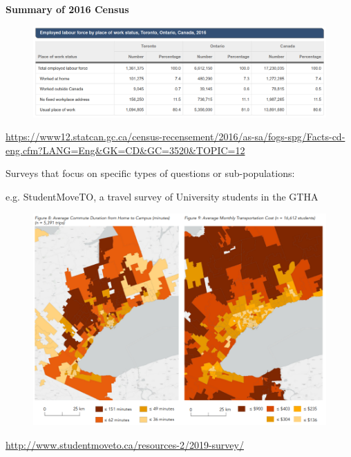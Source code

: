 \documentclass[aspectratio=169]{beamer}
\begin{document}
\begin{frame}
	
	\textbf{Summary of 2016 Census}
	
	\begin{figure}
		\centering
		\includegraphics[width=1\linewidth]{images/tor_emp_2016.png}
	\end{figure}
	
	\tiny\url{https://www12.statcan.gc.ca/census-recensement/2016/as-sa/fogs-spg/Facts-cd-eng.cfm?LANG=Eng\&GK=CD\&GC=3520\&TOPIC=12}
	
	
\end{frame}




\begin{frame}
	
	Surveys that focus on specific types of questions or sub-populations:
	\vspace{2mm}
	
	e.g. StudentMoveTO, a travel survey of University students in the GTHA
	
	\begin{figure}
		\centering
		\includegraphics[width=0.7\linewidth]{images/smto_maps.png}
	\end{figure}
	
	\tiny\url{http://www.studentmoveto.ca/resources-2/2019-survey/}
	
\end{frame}
\end{document}
